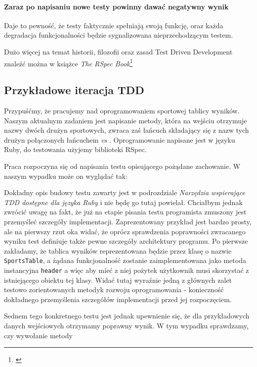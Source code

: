    \paragraph{Zaraz po napisaniu nowe testy powinny dawać negatywny wynik}
      Daje to pewność, że testy faktycznie spełniają swoją funkcję, oraz każda degradacja funkcjonalności będzie sygnalizowana nieprzechodzącym testem.
      
      Dużo więcej na temat historii, filozofii oraz zasad Test Driven Development znaleźć można w książce \emph{The RSpec Book}\footnote{\cite{rspec_book}}
      
  \subsection{Przykładowe iteracja TDD}
    Przypuśćmy, że pracujemy nad oprogramowaniem sportowej tablicy wyników. Naszym aktualnym zadaniem jest napisanie metody, która na wejściu otrzymuje nazwy dwóch drużyn sportowych, zwraca zaś łańcuch składający się z nazw tych drużyn połączonych łańcuchem \emph{ vs }. Oprogramowanie napisane jest w języku Ruby, do testowania użyjemy biblioteki RSpec.
    
    Praca rozpoczyna się od napisania testu opisującego pożądane zachowanie. W naszym wypadku może on wyglądać tak: 
    
    

    Dokładny opis budowy testu zawarty jest w podrozdziale \emph{Narzędzia wspierające TDD dostępne dla języka Ruby} i nie będę go tutaj powielał. Chciałbym jednak zwrócić uwagę na fakt, że już na etapie pisania testu programista zmuszony jest przemyśleć szczegóły implementacji. Zaprezentowany przykład jest bardzo prosty, ale na pierwszy rzut oka widać, że oprócz sprawdzenia poprawności zwracanego wyniku test definiuje także pewne szczegóły architektury programu. Po pierwsze zakładamy, że tablica wyników reprezentowana będzie przez klasę o nazwie \verb+SportsTable+, a żądana funkcjonalność zostanie zaimplementowana jako metoda instancyjna \verb+header+ a więc aby mieć z niej pożytek użytkownik musi skorzystać z istniejącego obiektu tej klasy. Widać tutaj wyraźnie jedną z głównych zalet testowo zorientowanych metodyk rozwoju oprogramowania - konieczność dokładnego przemyślenia szczegółów implementacji przed jej rozpoczęciem.
    
    Sednem tego konkretnego testu jest jednak upewnienie się, że dla przykładowych danych wejściowych otrzymamy poprawny wynik. W tym wypadku sprawdzamy, czy wywołanie metody 
    
